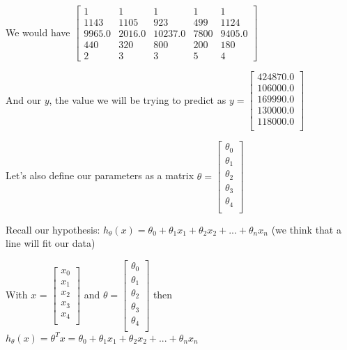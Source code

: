 \documentclass[11pt]{article}
\begin{document}
We would have 
 \(\begin{bmatrix}
 1 & 1 & 1 & 1 & 1 \\
1143 & 1105 & 923 & 499 & 1124 \\
9965.0 & 2016.0 & 10237.0 & 7800 & 9405.0 \\
440 & 320 & 800 & 200 & 180 \\
2 & 3 & 3 & 5 & 4 
 \end{bmatrix} \)
 
 And our $y$, the value we will be trying to predict as
\( y = \begin{bmatrix}
424870.0 \\
106000.0 \\
169990.0\\
130000.0\\
118000.0 \\
 \end{bmatrix}
\)

Let's also define our parameters as a matrix $\theta = 
\begin{bmatrix}
\theta_0 \\
\theta_1 \\
\theta_2 \\
\theta_3 \\
\theta_4\\
 \end{bmatrix}
 $

Recall our hypothesis: $h_\theta(x) = \theta_0 + \theta_1x_1+ \theta_2x_2 + ... +  \theta_nx_n$ (we think that a line will fit our data)

With $x$ = \(\begin{bmatrix}
x_0 \\
x_1 \\
x_2 \\
x_3 \\
x_4\\
 \end{bmatrix}\) and  $\theta = 
\begin{bmatrix}
\theta_0 \\
\theta_1 \\
\theta_2 \\
\theta_3 \\
\theta_4\\
 \end{bmatrix}
 $
then \\

$h_\theta(x) = \theta^Tx = \theta_0 + \theta_1x_1+ \theta_2x_2 + ... +  \theta_nx_n$ \\
\end{document}
